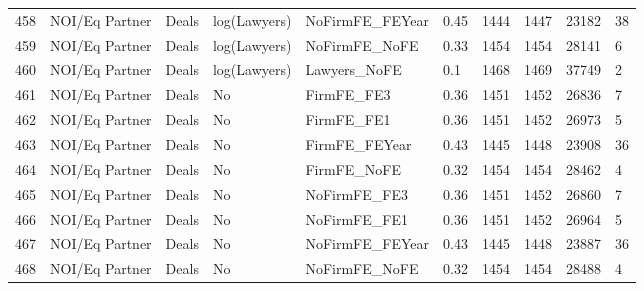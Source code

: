 \begin{table}[ht]
\begin{tabular}{rlllllllll}
  458 & NOI/Eq Partner & Deals & log(Lawyers) & NoFirmFE\_FEYear & 0.45 & 1444 & 1447 & 23182 & 38 \\ 
  459 & NOI/Eq Partner & Deals & log(Lawyers) & NoFirmFE\_NoFE & 0.33 & 1454 & 1454 & 28141 & 6 \\ 
  460 & NOI/Eq Partner & Deals & log(Lawyers) & Lawyers\_NoFE & 0.1 & 1468 & 1469 & 37749 & 2 \\ 
  461 & NOI/Eq Partner & Deals & No & FirmFE\_FE3 & 0.36 & 1451 & 1452 & 26836 & 7 \\ 
  462 & NOI/Eq Partner & Deals & No & FirmFE\_FE1 & 0.36 & 1451 & 1452 & 26973 & 5 \\ 
  463 & NOI/Eq Partner & Deals & No & FirmFE\_FEYear & 0.43 & 1445 & 1448 & 23908 & 36 \\ 
  464 & NOI/Eq Partner & Deals & No & FirmFE\_NoFE & 0.32 & 1454 & 1454 & 28462 & 4 \\ 
  465 & NOI/Eq Partner & Deals & No & NoFirmFE\_FE3 & 0.36 & 1451 & 1452 & 26860 & 7 \\ 
  466 & NOI/Eq Partner & Deals & No & NoFirmFE\_FE1 & 0.36 & 1451 & 1452 & 26964 & 5 \\ 
  467 & NOI/Eq Partner & Deals & No & NoFirmFE\_FEYear & 0.43 & 1445 & 1448 & 23887 & 36 \\ 
  468 & NOI/Eq Partner & Deals & No & NoFirmFE\_NoFE & 0.32 & 1454 & 1454 & 28488 & 4 \\ 
   \hline
\end{tabular}
\end{table}
